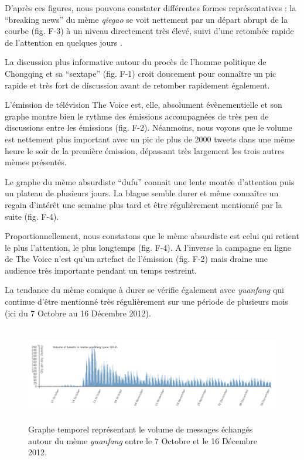 D{\textquoteright}apr\`es ces figures, nous pouvons constater
diff\'erentes formes repr\'esentatives : la {\textquotedblleft}breaking
news{\textquotedblright} du m\`eme \textit{qiegao} se voit nettement
par un d\'epart abrupt de la courbe (fig. F-3) \`a un niveau
directement tr\`es \'elev\'e, suivi d{\textquoteright}une retomb\'ee
rapide de l{\textquoteright}attention en quelques jours . 

La discussion plus informative autour du proc\`es de
l{\textquoteright}homme politique de Chongqing et sa
{\textquotedblleft}sextape{\textquotedblright} (fig. F-1) croit
doucement pour conna\^itre un pic rapide et tr\`es fort de discussion
avant de retomber rapidement \'egalement. 

L{\textquoteright}\'emission de t\'el\'evision The Voice est, elle,
absolument \'ev\`enementielle et son graphe montre bien le rythme des
\'emissions accompagn\'ees de tr\`es peu de discussions entre les
\'emissions (fig. F-2). N\'eanmoins, nous voyons que le volume est
nettement plus important avec un pic de plus de 2000 tweets dans une
m\^eme heure le soir de la premi\`ere \'emission, d\'epassant tr\`es
largement les trois autres m\`emes pr\'esent\'es. 

Le graphe du m\`eme absurdiste
{\textquotedblleft}dufu{\textquotedblright} connait une lente mont\'ee
d{\textquoteright}attention puis un plateau de plusieurs jours. La
blague semble durer et m\^eme conna\^itre un regain
d{\textquoteright}int\'er\^et une semaine plus tard et \^etre
r\'eguli\`erement mentionn\'e par la suite (fig. F-4). 

Proportionnellement, nous constatons que le m\`eme absurdiste est celui
qui retient le plus l{\textquoteright}attention, le plus longtemps
(fig. F-4). A l{\textquoteright}inverse la campagne en ligne de The
Voice n{\textquoteright}est qu{\textquoteright}un artefact de
l{\textquoteright}\'emission (fig. F-2) mais draine une audience tr\`es
importante pendant un temps restreint.


La tendance du m\`eme comique \`a durer se v\'erifie \'egalement avec
\textit{yuanfang }qui continue d{\textquoteright}\^etre mentionn\'e
tr\`es r\'eguli\`erement sur une p\'eriode de plusieurs mois (ici du 7
Octobre au 16 D\'ecembre 2012). 

\begin{figure}
    \centering
    
  \includegraphics[width=6.0087in,height=1.6697in]{figures/chap4/chapitre4-img5.png}
    
  \caption{
   Graphe temporel repr\'esentant le volume de messages \'echang\'es  autour du m\`eme \textit{yuanfang} entre le 7 Octobre et le 16 D\'ecembre 2012.
  }
\end{figure}


